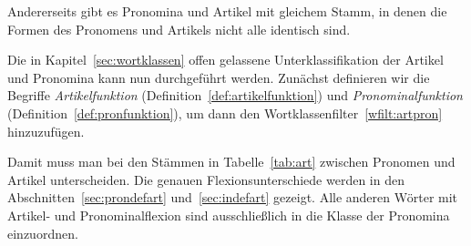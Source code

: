 Andererseits gibt es Pronomina und Artikel mit gleichem Stamm, in denen die Formen des Pronomens und Artikels nicht alle identisch sind.

\begin{exe}
  \ex \label{ex:flex7973}
  \begin{xlist}
  \end{xlist}
  \ex \label{ex:flex7974}
  \begin{xlist}
  \end{xlist}
  \ex \label{ex:flex7975}
  \begin{xlist}
  \end{xlist}
\end{exe}

Die in Kapitel~\ref{sec:wortklassen} offen gelassene Unterklassifikation der Artikel und Pronomina kann nun durchgeführt werden.
Zunächst definieren wir die Begriffe \textit{Artikelfunktion} (Definition~\ref{def:artikelfunktion}) und \textit{Pronominalfunktion} (Definition~\ref{def:pronfunktion}), um dann den Wortklassenfilter~\ref{wfilt:artpron} hinzuzufügen.



\Unstretch[1]




Damit muss man bei den Stämmen in Tabelle~\ref{tab:art} zwischen Pronomen und Artikel unterscheiden.
Die genauen Flexionsunterschiede werden in den Abschnitten~\ref{sec:prondefart} und~\ref{sec:indefart} gezeigt.
Alle anderen Wörter mit Artikel- und Pronominalflexion sind ausschließlich in die Klasse der Pronomina einzuordnen.

